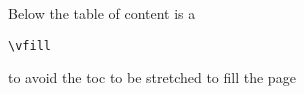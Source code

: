 \documentclass[11pt,twoside,a4paper]{article}
\begin{document}

\tableofcontents
\vfill
Below the table of content is a \begin{verbatim}\vfill\end{verbatim} to avoid the toc to be stretched to fill the page
\vfill
\vfill



\vfill \pagebreak

\vfill \pagebreak

\vfill \pagebreak

\vfill \pagebreak
\appendix
\listoftables
\listoffigures
\printindex
\end{document}
